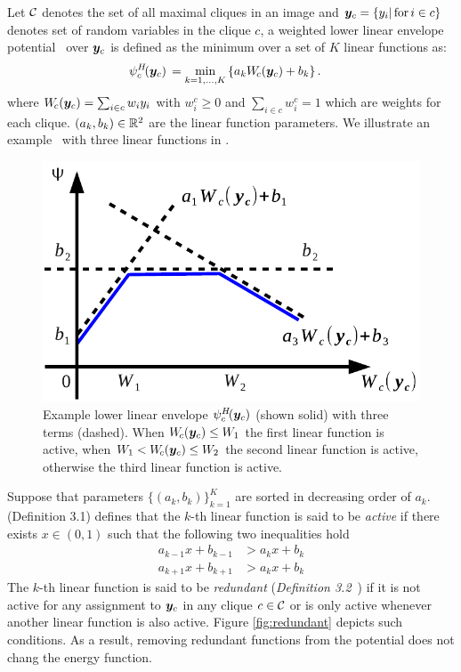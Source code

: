 Let ${\mathcal{C}}$ denotes the set of all maximal cliques in an image and
${\bm{y}}_c=\{y_i |\text{\,for\,} i \in c\}$ denotes set of random
variables in the clique $c$, a weighted lower linear envelope
potential~\cite{gouldlearning} over ${\bm{y}}_c$ is defined as the
minimum over a set of $K$ linear functions as:
%
\begin{align}
  \psi^H_c\!({\bm{y}}_c) \, &= \min_{k=1, \ldots, K} \left\{ a_k W_{\!c}({\bm{y}}_c) + b_k \right\}.
  \label{eqn:potential2}
\end{align}
%
where $W_{\!c}({\bm{y}}_c) = \sum_{i \in c} w_i y_i$ with $w^c_i \geq
0$ and $\sum_{i \in c} w^c_i = 1$ which are weights for each
clique. $(a_k, b_k) \in {\mathbb{R}}^2$ are the linear function
parameters. We illustrate an example~\cite{gouldlearning} with
three linear functions in .
%
\begin{figure}[ht]
  \centering
  \includegraphics[width=0.6\columnwidth]{Part2/figures/not_redundant}
  \caption{\label{fig:nonredundant} Example lower linear envelope
    $\psi^H_c\!({\bm{y}}_c)$ (shown solid) with three terms (dashed).
    When $W_{\!c}({\bm{y}}_c) \leq W_1$ the first linear function is
    active, when $W_1 < W_{\!c}({\bm{y}}_c) \leq W_2$ the second
    linear function is active, otherwise the third linear
    function is active.}
\end{figure}

Suppose that parameters $\{(a_k, b_k)\}_{k=1}^K$ are sorted in
decreasing order of $a_k$.  (Definition
3.1) defines that the $k$-th linear function is said to be
\emph{active} if there exists $x \in (0, 1)$ such that the
following two inequalities hold
\begin{align}
  a_{k-1} x + b_{k-1} &> a_k x + b_k \nonumber \\
  a_{k+1} x + b_{k+1} &> a_k x + b_k
  \label{eqn:nonred_in_ab}
\end{align}
%
The $k$-th linear function is said to be \emph{redundant}
(\emph{Definition 3.2}~\cite{gouldlearning}) if it is not active
for any assignment to ${\bm{y}}_c$ in any clique $c \in {\mathcal{C}}$ or is only
active whenever another linear function is also active.
Figure \ref{fig:redundant} depicts such conditions. As a
result, removing redundant functions from the potential does not
chang the energy function.

